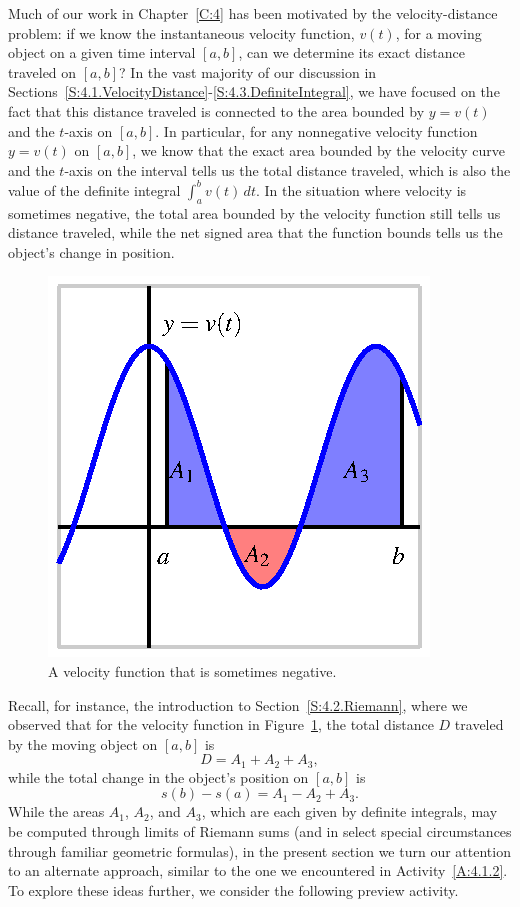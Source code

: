 Much of our work in Chapter~\ref{C:4} has been motivated by the velocity-distance problem:  if we know the instantaneous velocity function, $v(t)$, for a moving object on a given time interval $[a,b]$, can we determine its exact distance traveled on $[a,b]$?  In the vast majority of our discussion in Sections~\ref{S:4.1.VelocityDistance}-\ref{S:4.3.DefiniteIntegral}, we have focused on the fact that this distance traveled is connected to the area bounded by $y = v(t)$ and the $t$-axis on $[a,b]$.  In particular, for any nonnegative velocity function $y = v(t)$ on $[a,b]$, we know that the exact area bounded by the velocity curve and the $t$-axis on the interval tells us the total distance traveled, which is also the value of the definite integral $\int_a^b v(t) \, dt$.  In the situation where velocity is sometimes negative, the total area bounded by the velocity function still tells us distance traveled, while the net signed area that the function bounds tells us the object's change in position.  
\begin{figure}[h]
\begin{center}
\includegraphics{figures/4_2_Intro.eps}
\caption{A velocity function that is sometimes negative.} \label{F:4.4.Intro}
\end{center}
\end{figure} 
Recall, for instance, the introduction to Section~\ref{S:4.2.Riemann}, where we observed that for the velocity function in Figure~\ref{F:4.4.Intro}, the total distance $D$ traveled by the moving object on $[a,b]$ is 
$$D = A_1 + A_2 + A_3,$$
while the total change in the object's position on $[a,b]$ is 
$$s(b) - s(a) = A_1 - A_2 + A_3.$$
While the areas $A_1$, $A_2$, and $A_3$, which are each given by definite integrals, may be computed through limits of Riemann sums (and in select special circumstances through familiar geometric formulas), in the present section we turn our attention to an alternate approach, similar to the one we encountered in Activity~\ref{A:4.1.2}.  To explore these ideas further, we consider the following preview activity.

